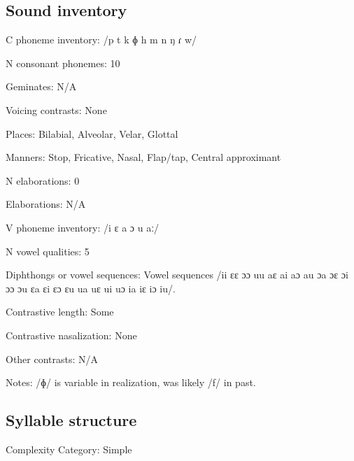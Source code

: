 {\subsection*{Sound inventory}
\begin{appendixdesc}

\item[C phoneme inventory:] /p t k ɸ h m n ŋ ɾ w/

\item[N consonant phonemes:] 10

\item[Geminates:] N/A

\item[Voicing contrasts:] None

\item[Places:] Bilabial, Alveolar, Velar, Glottal

\item[Manners:] Stop, Fricative, Nasal, Flap/tap, Central approximant

\item[N elaborations:] 0

\item[Elaborations:] N/A

\item[V phoneme inventory:] /i ɛ a ɔ u aː/

\item[N vowel qualities:] 5

\item[Diphthongs or vowel sequences:] Vowel sequences /ii ɛɛ ɔɔ uu aɛ ai aɔ au ɔa ɔɛ ɔi ɔɔ ɔu ɛa ɛi ɛɔ ɛu ua uɛ ui uɔ ia iɛ iɔ iu/.

\item[Contrastive length:] Some

\item[Contrastive nasalization:] None

\item[Other contrasts:] N/A

\item[Notes:] /ɸ/ is variable in realization, was likely /f/ in past.
\end{appendixdesc}
\subsection*{Syllable structure}
\begin{appendixdesc}

\item[Complexity Category:] Simple


\end{appendixdesc}}
